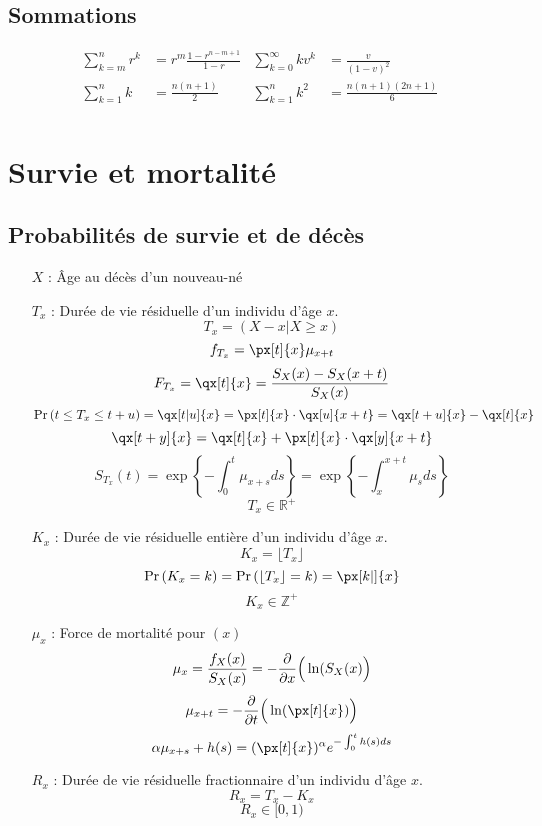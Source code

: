 \documentclass[10pt, french]{article}
\begin{document}
\begin{multicols*}{3}
\setlength{\mathindent}{1cm}

\subsection*{Sommations}
\begin{align*}
\sum_{k = m}^{n} r^k &= r^{m} \frac{1 - r^{n - m + 1}}{1 - r} &
\sum_{k = 0}^{\infty}k v^k &= \frac{v}{(1 - v)^2} \\
\sum_{k = 1}^{n}k &= \frac{n(n + 1)}{2} &
\sum_{k = 1}^{n}k^2 &= \frac{n(n + 1)(2n + 1)}{6} \\
\end{align*}

\section{Survie et mortalité}
\setcounter{subsection}{1}
\subsection{Probabilités de survie et de décès}
\begin{itemize}
\item[$X$ : ] Âge au décès d'un nouveau-né
\item[$T_x$ : ] Durée de vie résiduelle d'un individu d'âge $x$.
\[T_x = (X-x | X \geq x) \]
\[ f_{T_x} = \px[t]{x} \mu_{x+t} \]
\[ F_{T_x}   =\qx[t]{x} = \frac{S_X(x) - S_X(x+t)}{S_X(x)}  \]
\[ \prob{t \leq T_x \leq t+u} = \qx[t|u]{x} = \px[t]{x} \cdot \qx[u]{x+t} = \qx[t + u]{x} - \qx[t]{x} \]
\[ \qx[t + y]{x} = \qx[t]{x} + \px[t]{x} \cdot \qx[y]{x + t}\]
\[S_{T_x}(t) = \exp \left\{ - \int_{0}^{t} \mu_{x+s} ds \right\} = \exp \left\{ - \int_{x}^{x + t} \mu_{s} ds \right\}  \]
\[T_x \in \mathbb{R}^+ \]

\item[$K_x$ : ] Durée de vie résiduelle entière d'un individu d'âge $x$.
\[K_x = \lfloor T_x \rfloor \]
\[\prob{K_x = k} = \prob{\lfloor T_x \rfloor = k} = \px[k|]{x} \]
\[K_x \in \mathbb{Z}^+ \]

\item[$\mu_x$ : ] Force de mortalité pour $(x)$
\[\mu_x = \frac{f_X(x)}{S_X(x)} = -\frac{\partial}{\partial x} \Big( \ln(S_X(x)\Big) \]
\[\mu_{x+t} = - \derivee{t} \Big( \ln ( \px[t]{x}) \Big) \]
\[\alpha\mu_{x+s} + h(s) = (\px[t]{x})^\alpha e^{-\int_{0}^{t}h(s)ds } \]


\item[$R_x$ : ] Durée de vie résiduelle fractionnaire d'un individu d'âge $x$.
\[R_x = T_x - K_x\]
\[R_x \in [0, 1) \]


\end{itemize}
\end{multicols*}
\end{document}
